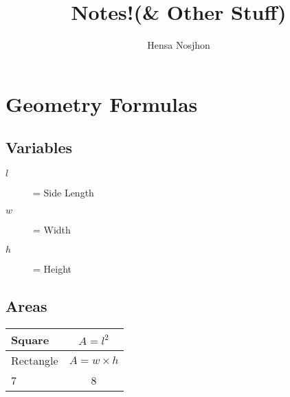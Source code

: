 \documentclass[12pt]{report}
\title{\Huge Notes!\normalsize (\& Other Stuff)}
\author{Hensa Nosjhon}
\date{}
\begin{document}
\maketitle
\tableofcontents

\chapter*{Geometry Formulas}
\section*{Variables}
\begin{description}
	\item [$l$] = Side Length
	\item [$w$] = Width
	\item [$h$] = Height
\end{description}
\section*{Areas}
\begin{center}
	\begin{tabular}{ | l | c |}
		\hline
		Square & $A=l^2$\\ \hline
		Rectangle & $A=w\times h$\\ \hline
		7 & 8\\
		\hline
	\end{tabular}
\end{center}
\end{document}
